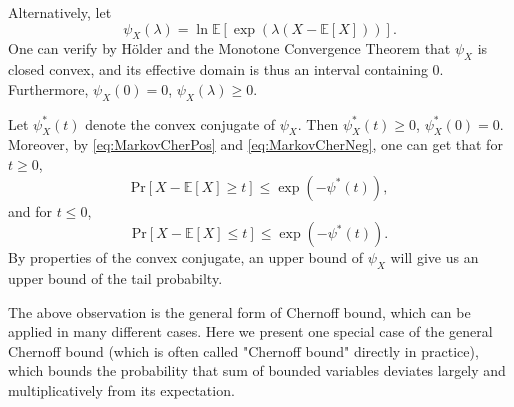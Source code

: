 \documentclass[openany]{book}
\theoremstyle{definition}
\theoremstyle{remark}
\begin{document}
Alternatively, let
\begin{equation}\label{eq:logMGF}
    \psi_X(\lambda)=\ln \mathbb{E}\left[\exp\left(\lambda\left(X-\mathbb{E}[X]\right)\right)\right].
\end{equation}
One can verify by H\"{o}lder and the Monotone Convergence Theorem that $\psi_X$ is closed convex, and its effective domain is thus an interval containing $0$. Furthermore, $\psi_X(0)=0$, $\psi_X(\lambda)\ge0$.

Let $\psi_X^*(t)$ denote the convex conjugate of $\psi_X$. Then $\psi_X^*(t)\ge0$, $\psi_X^*(0)=0$. Moreover, by \eqref{eq:MarkovCherPos} and \eqref{eq:MarkovCherNeg}, one can get that for $t\ge0$,
\begin{equation}\label{eq:ChernoffPos}
    \mathrm{Pr}\left[X-\mathbb{E}[X]\ge t\right]\le\exp\left(-\psi^*(t)\right),
\end{equation}
and for $t\le0$,
\begin{equation}\label{eq:ChernoffNeg}
    \mathrm{Pr}\left[X-\mathbb{E}[X]\le t\right]\le\exp\left(-\psi^*(t)\right).
\end{equation}
By properties of the convex conjugate, an upper bound of $\psi_X$ will give us an upper bound of the tail probabilty.

The above observation is the general form of Chernoff bound, which can be applied in many different cases. Here we present one special case of the general Chernoff bound (which is often called "Chernoff bound" directly in practice), which bounds the probability that sum of bounded variables deviates largely and multiplicatively from its expectation.
\end{document}

